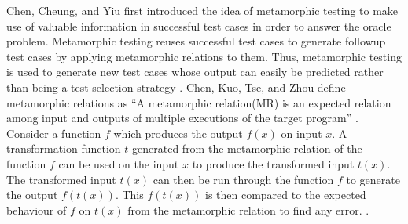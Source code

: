 Chen, Cheung, and Yiu \cite{Chen1998} first introduced the idea of metamorphic testing to make use of valuable information in successful test cases in order to answer the oracle problem. Metamorphic testing reuses successful test cases to generate followup test cases by applying metamorphic relations to them. Thus, metamorphic testing is used to generate new test cases whose output can easily be predicted rather than being a test selection strategy \cite{Murphy2008}. Chen, Kuo, Tse, and Zhou define metamorphic relations as \enquote{A metamorphic relation(MR) is an expected relation among input and outputs of multiple executions of the target program} \cite{Chen2003,Zhou2016}. Consider a function $f$ which produces the output $f(x)$ on input $x$. A transformation function $t$ generated from the metamorphic relation of the function $f$ can be used on the input $x$ to produce the transformed input $t(x)$. The transformed input $t(x)$ can then be run through the function $f$ to generate the output $f(t(x))$. This $f(t(x))$ is then compared to the expected behaviour of $f$ on $t(x)$ from the metamorphic relation to find any error. \cite{Murphy2009}. 


